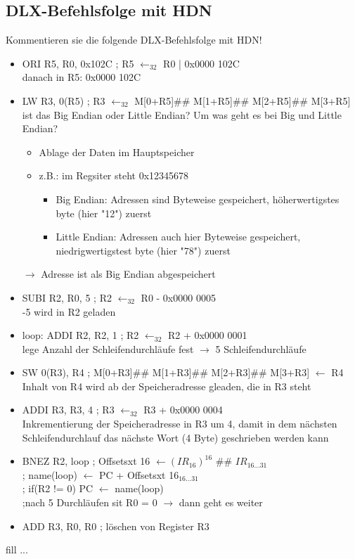 \subsection{DLX-Befehlsfolge mit HDN}
Kommentieren sie die folgende DLX-Befehlsfolge mit HDN!
\begin{itemize}
	\item ORI R5, R0, 0x102C ; R5 $\leftarrow_{32}$ R0 | 0x0000 102C \\danach in R5: 0x0000 102C
	\item LW R3, 0(R5) ; R3 $\leftarrow_{32}$ M[0+R5]\#\# M[1+R5]\#\# M[2+R5]\#\# M[3+R5] \\ist das Big Endian oder Little Endian? Um was geht es bei Big und Little Endian?
	\begin{itemize}
		\item Ablage der Daten im Hauptspeicher
		\item z.B.: im Regsiter steht 0x12345678
		\begin{itemize}
			\item Big Endian: Adressen sind Byteweise gespeichert, höherwertigstes byte (hier "12") zuerst
			\item Little Endian: Adressen auch hier Byteweise gespeichert, niedrigwertigstest byte (hier "78") zuerst
		\end{itemize}
	\end{itemize}
	$\to$ Adresse ist als Big Endian abgespeichert
	\item SUBI R2, R0, 5 ; R2 $\leftarrow_{32}$ R0 - 0x0000 0005\\-5 wird in R2 geladen
	\item loop: ADDI R2, R2, 1 ; R2 $\leftarrow_{32}$ R2 + 0x0000 0001 \\lege Anzahl der Schleifendurchläufe fest $\to$ 5 Schleifendurchläufe
	\item SW 0(R3), R4 ; M[0+R3]\#\# M[1+R3]\#\# M[2+R3]\#\# M[3+R3] $\leftarrow $ R4 \\ Inhalt von R4 wird ab der Speicheradresse gleaden, die in R3 steht
	\item ADDI R3, R3, 4 ; R3 $\leftarrow_{32}$ R3 + 0x0000 0004 \\ Inkrementierung der Speicheradresse in R3 um 4, damit in dem nächsten Schleifendurchlauf das nächste Wort (4 Byte) geschrieben werden kann
	\item BNEZ R2, loop ; Offsetsxt 16 $\leftarrow (IR_{16})^{16}$ \#\# $IR_{16\ldots 31}$ \\; name(loop) $\leftarrow$ PC + Offsetsxt 16$_{16\ldots 31}$ \\ ; if(R2 != 0) PC $\leftarrow$ name(loop) \\
	;nach 5 Durchläufen sit R0 = 0 $\to$ dann geht es weiter
	\item ADD R3, R0, R0 ; löschen von Register R3
\end{itemize}
fill ...
